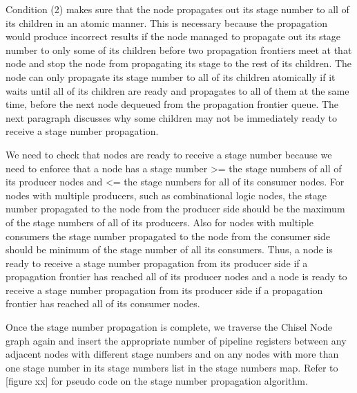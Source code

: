 Condition (2) makes sure that the node propagates out its stage number to all of its children in an atomic manner. This is necessary because the propagation would produce incorrect results if the node managed to propagate out its stage number to only some of its children before two propagation frontiers meet at that node and stop the node from propagating its stage to the rest of its children. The node can only propagate its stage number to all of its children atomically if it waits until all of its children are ready and propagates to all of them at the same time, before the next node dequeued from the propagation frontier queue. The next paragraph discusses why some children may not be immediately ready to receive a stage number propagation.

We need to check that nodes are ready to receive a stage number because we need to enforce that a node has a stage number >= the stage numbers of all of its producer nodes and <= the stage numbers for all of its consumer nodes. For nodes with multiple producers, such as combinational logic nodes, the stage number propagated to the node from the producer side should be the maximum of the stage numbers of all of its producers. Also for nodes with multiple consumers the stage number propagated to the node from the consumer side should be minimum of the stage number of all its consumers. Thus, a node is ready to receive a stage number propagation from its producer side if a propagation frontier has reached all of its producer nodes and a node is ready to receive a stage number propagation from its producer side if a propagation frontier has reached all of its consumer nodes.

Once the stage number propagation is complete, we traverse the Chisel Node graph again and insert the appropriate number of pipeline registers between any adjacent nodes with different stage numbers and on any nodes with more than one stage number in its stage numbers list in the stage numbers map. Refer to [figure xx] for pseudo code on the stage number propagation algorithm.
